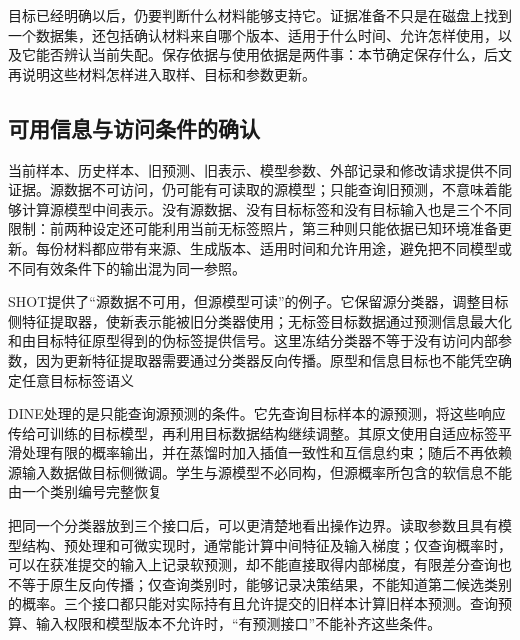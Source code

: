 目标已经明确以后，仍要判断什么材料能够支持它。证据准备不只是在磁盘上找到一个数据集，还包括确认材料来自哪个版本、适用于什么时间、允许怎样使用，以及它能否辨认当前失配。保存依据与使用依据是两件事：本节确定保存什么，后文再说明这些材料怎样进入取样、目标和参数更新。

\subsection{可用信息与访问条件的确认}
\label{sec:ket-update-access}

当前样本、历史样本、旧预测、旧表示、模型参数、外部记录和修改请求提供不同证据。源数据不可访问，仍可能有可读取的源模型；只能查询旧预测，不意味着能够计算源模型中间表示。没有源数据、没有目标标签和没有目标输入也是三个不同限制：前两种设定还可能利用当前无标签照片，第三种则只能依据已知环境准备更新。每份材料都应带有来源、生成版本、适用时间和允许用途，避免把不同模型或不同有效条件下的输出混为同一参照。

SHOT提供了“源数据不可用，但源模型可读”的例子。它保留源分类器，调整目标侧特征提取器，使新表示能被旧分类器使用；无标签目标数据通过预测信息最大化和由目标特征原型得到的伪标签提供信号。这里冻结分类器不等于没有访问内部参数，因为更新特征提取器需要通过分类器反向传播。原型和信息目标也不能凭空确定任意目标标签语义

DINE处理的是只能查询源预测的条件。它先查询目标样本的源预测，将这些响应传给可训练的目标模型，再利用目标数据结构继续调整。其原文使用自适应标签平滑处理有限的概率输出，并在蒸馏时加入插值一致性和互信息约束；随后不再依赖源输入数据做目标侧微调。学生与源模型不必同构，但源概率所包含的软信息不能由一个类别编号完整恢复

把同一个分类器放到三个接口后，可以更清楚地看出操作边界。读取参数且具有模型结构、预处理和可微实现时，通常能计算中间特征及输入梯度；仅查询概率时，可以在获准提交的输入上记录软预测，却不能直接取得内部梯度，有限差分查询也不等于原生反向传播；仅查询类别时，能够记录决策结果，不能知道第二候选类别的概率。三个接口都只能对实际持有且允许提交的旧样本计算旧样本预测。查询预算、输入权限和模型版本不允许时，“有预测接口”不能补齐这些条件。

